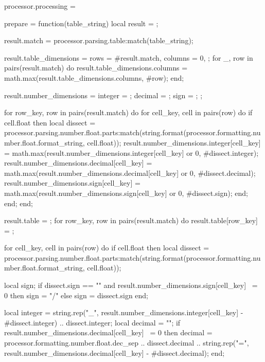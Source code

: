     processor.processing = {
        prepare = function(table_string)
            local result = {};

            result.match = processor.parsing.table:match(table_string);

            result.table_dimensions = {
                rows = #result.match,
                columns = 0,
            };
            for _, row in pairs(result.match) do
                result.table_dimensions.columns = math.max(result.table_dimensions.columns, #row);
            end;

            result.number_dimensions = {
                integer = {};
                decimal = {};
                sign = {};
            };

            for row_key, row in pairs(result.match) do
                for cell_key, cell in pairs(row) do
                    if cell.float then
                        local dissect = processor.parsing.number.float.parts:match(string.format(processor.formatting.number.float.format_string, cell.float));
                        result.number_dimensions.integer[cell_key] = math.max(result.number_dimensions.integer[cell_key] or 0, #dissect.integer);
                        result.number_dimensions.decimal[cell_key] = math.max(result.number_dimensions.decimal[cell_key] or 0, #dissect.decimal);
                        result.number_dimensions.sign[cell_key] = math.max(result.number_dimensions.sign[cell_key] or 0, #dissect.sign);
                    end;
                end;
            end;

            result.table = {};
            for row_key, row in pairs(result.match) do
                result.table[row_key] = {};

                for cell_key, cell in pairs(row) do
                    if cell.float then
                        local dissect = processor.parsing.number.float.parts:match(string.format(processor.formatting.number.float.format_string, cell.float));

                        local sign;
                        if dissect.sign == "" and result.number_dimensions.sign[cell_key] ~= 0 then
                            sign = "/"
                        else
                            sign = dissect.sign
                        end;

                        local integer = string.rep("_", result.number_dimensions.integer[cell_key] - #dissect.integer) .. dissect.integer;
                        local decimal = "";
                        if result.number_dimensions.decimal[cell_key] ~= 0 then
                            decimal = 
                                   processor.formatting.number.float.dec_sep
                                .. dissect.decimal
                                .. string.rep("=", result.number_dimensions.decimal[cell_key] - #dissect.decimal);
                        end;

}
